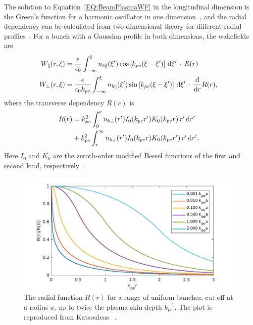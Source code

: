 The solution to Equation~\ref{EQ:BeamPlasmaWF} in the longitudinal dimension is the Green’s function for a harmonic oscillator in one dimension~\cite{katsouleas:1987}, and the radial dependency can be calculated from two-dimensional theory for different radial profiles~\cite{chen:1987}.
For a bunch with a Gaussian profile in both dimensions, the wakefields are
\begin{align}
    W_{\parallel}(r,\xi) &= \frac{e}{\epsilon_{0}}
        \int_{-\infty}^{\xi} n_{b\parallel}(\xi^{\prime}) \cos\left[k_{pe}(\xi-\xi^{\prime})\right] \,\mathrm{d}\xi^{\prime} \,\cdot\, R(r) \label{EQ:WzFull} \\
    W_{\perp}(r,\xi) &= \frac{e}{\epsilon_{0}k_{pe}}
        \int_{-\infty}^{\xi} n_{b\parallel}(\xi^{\prime}) \sin\left[k_{pe}(\xi-\xi^{\prime})\right] \,\mathrm{d}\xi^{\prime} \,\cdot\, \frac{\mathrm{d}}{\mathrm{d}r}R(r), \label{EQ:WrFull}
\end{align}
where the transverse dependency $R(r)$ is
\begin{align}
    R(r) &= k_{pe}^{2} \int_{0}^{r} n_{b\perp}(r^{\prime}) I_{0}(k_{pe}r^{\prime})
           K_{0}(k_{pe}r) \,r^{\prime}\,\mathrm{d} r^{\prime} \nonumber \\
         &+ k_{pe}^{2} \int_{r}^{\infty} n_{b\perp}(r^{\prime}) I_{0}(k_{pe}r)
           K_{0}(k_{pe}r^{\prime}) \,r^{\prime}\,\mathrm{d} r^{\prime}. \label{EQ:WFRadial}
\end{align}
Here $I_{0}$ and $K_{0}$ are the zeroth-order modified Bessel functions of the first and second kind, respectively~\cite{chen:1987,muggli:2017}.

\begin{figure}[hbt]
    \centering
    \includegraphics[width=0.8125\linewidth,trim={0mm 0mm 0mm 0mm},clip]{figures/RepKatsouleas1987}
    \caption{\label{Fig:BPI:Kat87}
        The radial function $R(r)$ for a range of uniform bunches, cut off at a radius $a$, up to twice the plasma skin depth $k_{pe}^{-1}$.
        The plot is reproduced from Katsouleas \etal~\cite{katsouleas:1987}.
    }
\end{figure}

